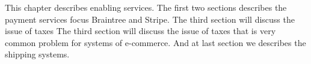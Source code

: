 This chapter describes enabling services.
\newline
The first two sections describes the payment services focus Braintree and Stripe.
\newline
The third section will discuss the issue of taxes The third section will discuss the issue of taxes that is very common problem for systems of e-commerce. And at last section we describes the shipping systems.